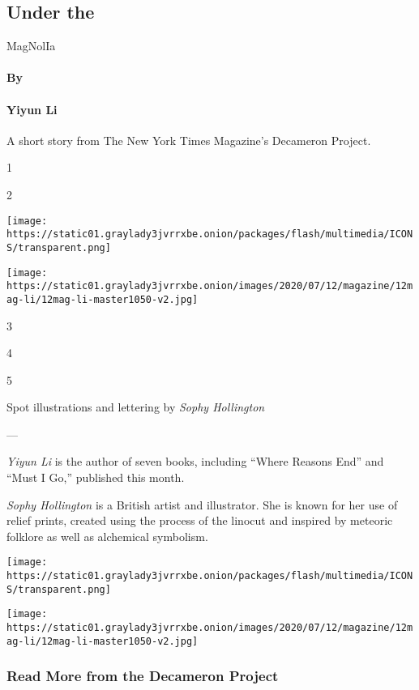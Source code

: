 \hypertarget{under-the}{%
\subsection{Under the}\label{under-the}}

MagNolIa

\hypertarget{by}{%
\paragraph{By}\label{by}}

\hypertarget{yiyun-li}{%
\paragraph{Yiyun Li}\label{yiyun-li}}

A short story from The New York Times Magazine's Decameron Project.

1

2

\texttt{[image: https://static01.graylady3jvrrxbe.onion/packages/flash/multimedia/ICONS/transparent.png]}

\texttt{[image: https://static01.graylady3jvrrxbe.onion/images/2020/07/12/magazine/12mag-li/12mag-li-master1050-v2.jpg]}

3

4

5

Spot illustrations and lettering by \emph{Sophy Hollington}

---

\emph{Yiyun Li} is the author of seven books, including ``Where Reasons
End'' and ``Must I Go,'' published this month.

\emph{Sophy Hollington} is a British artist and illustrator. She is
known for her use of relief prints, created using the process of the
linocut and inspired by meteoric folklore as well as alchemical
symbolism.

\texttt{[image: https://static01.graylady3jvrrxbe.onion/packages/flash/multimedia/ICONS/transparent.png]}

\texttt{[image: https://static01.graylady3jvrrxbe.onion/images/2020/07/12/magazine/12mag-li/12mag-li-master1050-v2.jpg]}

\hypertarget{read-more-from-the-decameron-project}{%
\subsubsection{Read More from the Decameron
Project}\label{read-more-from-the-decameron-project}}

